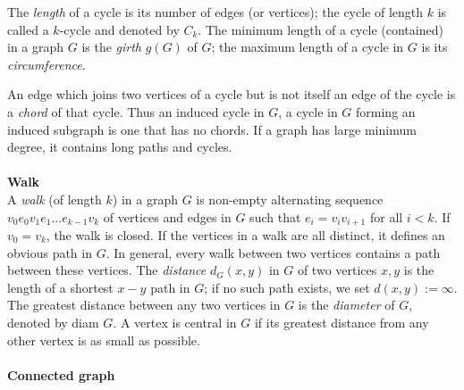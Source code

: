 \documentclass[12pt]{report}
\begin{document}
  The {\em length} of a cycle is its number of edges (or vertices); the cycle of length $k$ is called a $k$-cycle and denoted by $C_k$.
The minimum length of a cycle (contained) in a graph $G$ is the {\em
girth} $g(G)$ of $G$; the maximum length of a cycle in $G$ is its
{\em circumference}.

An edge which joins two vertices of a cycle but is not itself an
edge of the cycle is a {\em chord} of that cycle.
Thus an induced cycle in $G$, a cycle in $G$ forming an induced subgraph is one that has no chords. If a graph has large minimum degree, it contains long paths and cycles.\\
\\
{\bf   Walk}\\
A {\em walk} (of length $k$) in a graph $G$ is non-empty alternating
sequence $v_0e_0v_1e_1...e_{k-1}v_k$ of vertices and edges in $G$
such that $e_i={v_iv_{i+1}}$ for all $i< k$. If $v_0=v_k$, the walk
is closed. If the vertices in a walk are all distinct, it defines an
obvious path in $G$. In general, every walk between two vertices
contains a path between these vertices. The {\em distance}
$d_G(x,y)$ in $G$ of two vertices $x,y$ is the length of a shortest
$x-y$ path in $G$; if no such path exists, we set $d(x,y):=\infty$.
The greatest distance between any two vertices in $G$ is the {\em
diameter} of $G$, denoted by diam $G$. A vertex is central in $G$ if
its greatest distance from any other
vertex is as small as possible.\\
\\
{\bf Connected graph}\\
\end{document}
